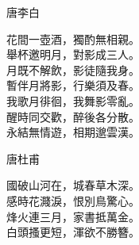\documentclass[禁則,森,便箋]{genkou}
\begin{document}
\par {} \hfill {\gtfamily 唐\quad 李白} \hspace{50 mm}

 花間一壺酒，獨酌無相親。\\
舉杯邀明月，對影成三人。\\
月既不解飲，影徒隨我身。\\
暫伴月將影，行樂須及春。\\
我歌月徘徊，我舞影零亂。\\
醒時同交歡，醉後各分散。\\
永結無情遊，相期邈雲漢。

\clearpage

\par {} \hfill {\gtfamily 唐\quad 杜甫}  \hspace{50 mm}

國破山河在，城春草木深。\\
感時花濺淚，恨別鳥驚心。\\
烽火連三月，家書抵萬金。\\
白頭搔更短，渾欲不勝簪。\\
\end{document}
